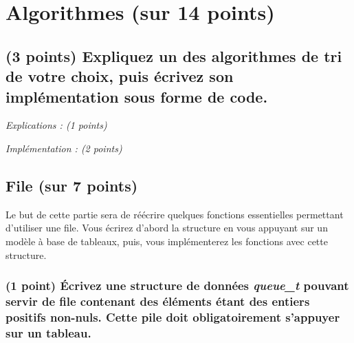 \documentclass[11pt,a4paper]{article}
\begin{document}
\clearpage


\section{Algorithmes (sur 14 points)}

%

\subsection{(3 points) Expliquez un des algorithmes de tri de votre choix, puis écrivez son implémentation sous forme de code. }

\textit{Explications : (1 points)}

\begin{center}
\end{center}


\textit{Implémentation : (2 points)}

\begin{center}
\end{center}


\clearpage


\subsection{File (sur 7 points)}

\noindent Le but de cette partie sera de réécrire quelques fonctions essentielles permettant d'utiliser une file.
Vous écrirez d'abord la structure en vous appuyant sur un modèle à base de tableaux, puis, vous implémenterez les fonctions avec cette structure.

\subsubsection{(1 point) \'Ecrivez une structure de données \og \textit{queue\_t} \fg{} pouvant servir de file contenant des éléments étant des entiers positifs non-nuls. Cette pile doit obligatoirement s'appuyer sur un tableau. }
\end{document}
